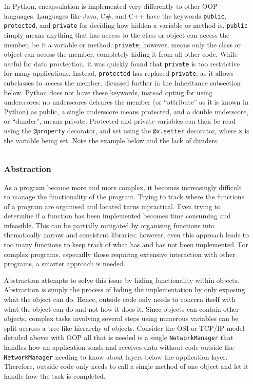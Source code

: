 \documentclass[11pt]{article}
\begin{document}
In Python, encapsulation is implemented very differently to other OOP languages. Languages like Java, C\#, and C++ have the keywords \texttt{public}, \texttt{protected}, and \texttt{private} for deciding how hidden a variable or method is. \texttt{public} simply means anything that has access to the class or object can access the member, be it a variable or method. \texttt{private}, however, means only the class or object can access the member, completely hiding it from all other code. While useful for data proctection, it was quickly found that \texttt{private} is too restrictive for many applications. Instead, \texttt{protected} has replaced \texttt{private}, as it allows subclasses to access the member, dicussed further in the Inheritance subsection below. Python does not have these keywords, instead opting for using underscores: no underscores delcares the member (or ``attribute'' as it is known in Python) as public, a single underscore means protected, and a double underscore, or ``dunder'', means private. Protected and private variables can then be read using the \texttt{@property} decorator, and set using the \texttt{@x.setter} decorator, where \texttt{x} is the variable being set. Note the example below and the lack of dunders.

\inputminted[linenos=true]{python}{python_examples/encapsulation.py}

\subsubsection{Abstraction}

As a program become more and more complex, it becomes increasingly difficult to manage the functionality of the program. Trying to track where the functions of a program are organised and located turns inpractical. Even trying to determine if a function has been implemented becomes time consuming and infeasible. This can be partially mitigated by organising functions into thematically narrow and consistent libraries; however, even this approach leads to too many functions to keep track of what has and has not been implemented. For complex programs, especailly those requiring extensive interaction with other programs, a smarter approach is needed.

Abstraction attempts to solve this issue by hiding functionality within objects. Abstraction is simply the process of hiding the implementation by only exposing what the object can do. Hence, outside code only needs to concern itself with what the object can do and not how it does it. Since objects can contain other objects, complex tasks involving several steps using numerous variables can be split accross a tree-like hierarchy of objects. Consider the OSI or TCP/IP model detailed above: with OOP all that is needed is a single \texttt{NetworkManager} that handles how an application sends and receives data without code outside the \texttt{NetworkManager} needing to know about layers below the application layer. Therefore, outside code only needs to call a single method of one object and let it handle how the task is completed.
\end{document}
